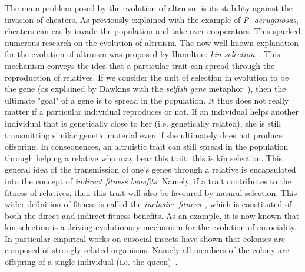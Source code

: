     The main problem posed by the evolution of altruism is its stability against the invasion of cheaters. As previously explained with the example of \emph{P. aeruginosas}, cheaters can easily invade the population and take over cooperators. This sparked numerous research on the evolution of altruism. The now well-known explanation for the evolution of altruism was proposed by Hamilton: \emph{kin selection}~\parencite{Hamilton1964}. This mechanism conveys the idea that a particular trait can spread through the reproduction of relatives. If we consider the unit of selection in evolution to be the gene (as explained by Dawkins with the \emph{selfish gene} metaphor~\parencite{Dawkins1976}), then the ultimate "goal" of a gene is to spread in the population. It thus does not really matter if a particular individual reproduces or not. If an individual helps another individual that is genetically close to her (i.e. genetically related), she is still transmitting similar genetic material even if she ultimately does not produce offspring. In consequences, an altruistic trait can still spread in the population through helping a relative who may bear this trait: this is kin selection. This general idea of the transmission of one's genes through a relative is encapsulated into the concept of \emph{indirect fitness benefits}. Namely, if a trait contributes to the fitness of relatives, then this trait will also be favoured by natural selection. This wider definition of fitness is called the \emph{inclusive fitness}~\parencite{Grafen1984}, which is constituted of both the direct and indirect fitness benefits. As an example, it is now known that kin selection is a driving evolutionary mechanism for the evolution of eusociality. In particular empirical works on eusocial insects have shown that colonies are composed of strongly related organisms. Namely all members of the colony are offspring of a single individual (i.e. the queen)~\parencite{Queller1998, Bourke2014}.





